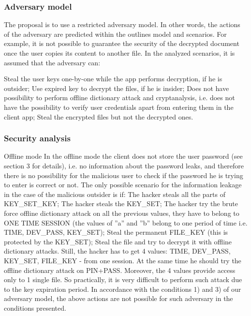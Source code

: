 \documentclass[twocolumn]{svjour3}          %
\begin{document}
\subsubsection{Adversary model}
\label{sec_adversary_model}
The proposal is to use a restricted adversary model. In other words, the actions of the adversary are predicted within the outlines model and scenarios. For example, it is not possible to guarantee the security of the decrypted document once the user copies its content to another file. In the analyzed scenarios, it is assumed that the adversary can:

Steal the user keys one-by-one while the app performs decryption, if he is outsider;
Use expired key to decrypt the files, if he is insider;
Does not have possibility to perform offline dictionary attack and cryptanalysis, i.e. does not have the possibility to verify user credentials apart from entering them in the client app;
Steal the encrypted files but not the decrypted ones.

\subsubsection{Security analysis}
\label{sec_sec_analysis}
Offline mode
In the offline mode the client does not store the user password (see section 3 for details), i.e. no information about the password leaks, and therefore there is no possibility for the malicious user to check if the password he is trying to enter is correct or not. The only possible scenario for the information leakage in the case of the malicious outsider is if:
The hacker steals all the parts of KEY\_SET\_KEY;
The hacker steals the KEY\_SET;
The hacker try the brute force offline dictionary attack on all the previous values, they have to belong to ONE TIME SESSION (the values of ”a” and ”b” belong to one period of time i.e. TIME, DEV\_PASS, KEY\_SET);
Steal the permanent FILE\_KEY (this is protected by the KEY\_SET);
Steal the file and try to decrypt it with offline dictionary attacks.
        Still, the hacker has to get 4 values: TIME, DEV\_PASS, KEY\_SET, FILE\_KEY - from one session. At the same time he should try the offline dictionary attack on PIN+PASS. Moreover, the 4 values provide access only to 1 single file. So practically, it is very difficult to perform such attack due to the key expiration period. In accordance with the conditions 1) and 3) of our adversary model, the above actions are not possible for such adversary in the conditions presented.
\end{document}
